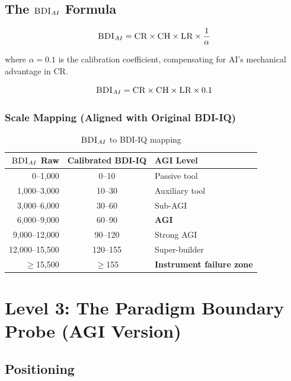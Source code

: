 \documentclass[11pt,a4paper]{article}
\theoremstyle{definition}
\theoremstyle{plain}
\newcommand{\BDI}{\textsc{BDI}}
\newcommand{\CR}{\textsc{CR}}
\newcommand{\CH}{\textsc{CH}}
\newcommand{\LR}{\textsc{LR}}
\begin{document}
\subsection{The $\BDI_{AI}$ Formula}

\begin{equation}
\BDI_{AI} = \CR{} \times \CH{} \times \LR{} \times \frac{1}{\alpha}
\end{equation}

where $\alpha = 0.1$ is the calibration coefficient, compensating for AI's mechanical advantage in \CR{}.

\begin{equation}
\BDI_{AI} = \CR{} \times \CH{} \times \LR{} \times 0.1
\end{equation}

\subsubsection{Scale Mapping (Aligned with Original \BDI{}-IQ)}

\begin{table}[htbp]
\centering
\caption{$\BDI_{AI}$ to \BDI{}-IQ mapping}
\label{tab:mapping}
\begin{tabular}{@{}rcl@{}}
\toprule
\textbf{$\BDI_{AI}$ Raw} & \textbf{Calibrated \BDI{}-IQ} & \textbf{AGI Level} \\
\midrule
0--1,000 & 0--10 & Passive tool \\
1,000--3,000 & 10--30 & Auxiliary tool \\
3,000--6,000 & 30--60 & Sub-AGI \\
6,000--9,000 & 60--90 & \textbf{AGI} \\
9,000--12,000 & 90--120 & Strong AGI \\
12,000--15,500 & 120--155 & Super-builder \\
$\geq$15,500 & $\geq$155 & \textbf{Instrument failure zone} \\
\bottomrule
\end{tabular}
\end{table}

\section{Level 3: The Paradigm Boundary Probe (AGI Version)}
\label{sec:level3}

\subsection{Positioning}
\end{document}
